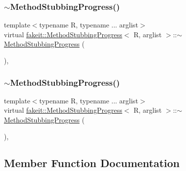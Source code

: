 \subsubsection{\texorpdfstring{$\sim$MethodStubbingProgress()}{~MethodStubbingProgress()}\hspace{0.1cm}{\footnotesize\ttfamily [8/9]}}
{\footnotesize\ttfamily template$<$typename R, typename ... arglist$>$ \\
virtual \mbox{\hyperlink{structfakeit_1_1MethodStubbingProgress}{fakeit\+::\+Method\+Stubbing\+Progress}}$<$ R, arglist $>$\+::$\sim$\mbox{\hyperlink{structfakeit_1_1MethodStubbingProgress}{Method\+Stubbing\+Progress}} (\begin{DoxyParamCaption}{ }\end{DoxyParamCaption})\hspace{0.3cm}{\ttfamily [inline]}, {\ttfamily [virtual]}}

\mbox{\label{structfakeit_1_1MethodStubbingProgress_aed2c96ce537706935976943354c49616}} 
\subsubsection{\texorpdfstring{$\sim$MethodStubbingProgress()}{~MethodStubbingProgress()}\hspace{0.1cm}{\footnotesize\ttfamily [9/9]}}
{\footnotesize\ttfamily template$<$typename R, typename ... arglist$>$ \\
virtual \mbox{\hyperlink{structfakeit_1_1MethodStubbingProgress}{fakeit\+::\+Method\+Stubbing\+Progress}}$<$ R, arglist $>$\+::$\sim$\mbox{\hyperlink{structfakeit_1_1MethodStubbingProgress}{Method\+Stubbing\+Progress}} (\begin{DoxyParamCaption}{ }\end{DoxyParamCaption})\hspace{0.3cm}{\ttfamily [inline]}, {\ttfamily [virtual]}}



\subsection{Member Function Documentation}
\mbox{\label{structfakeit_1_1MethodStubbingProgress_a47464ab35cb06c00dbd00a13328b80a7}} 
